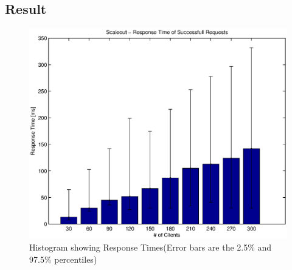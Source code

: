 \documentclass[a4paper]{article}
\begin{document}
\subsection{Result}



\begin{figure}[H]
	\begin{center}
    \includegraphics[scale=0.6]{../plots-ms2-mg/experiment-rt.eps}
  \end{center}
  \caption{Histogram showing Response Times\newline(Error bars are the 2.5\% and 97.5\% percentiles)}
  \label{fig:experiment-rt}
\end{figure}



\end{document}
